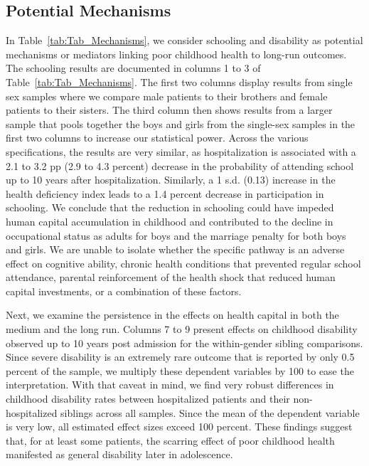 \documentclass[12pt,english]{article}
\begin{document}
\subsection[Potential mechanisms]{Potential Mechanisms}\label{subsec:Mechanisms}

In Table~\ref{tab:Tab_Mechanisms}, we consider schooling and disability as potential mechanisms or mediators linking poor childhood health to long-run outcomes. The schooling results are documented in columns 1 to 3 of Table~\ref{tab:Tab_Mechanisms}. The first two columns display results from single sex samples where we compare male patients to their brothers and female patients to their sisters. The third column then shows results from a larger sample that pools together the boys and girls from the single-sex samples in the first two columns to increase our statistical power. Across the various specifications, the results are very similar, as hospitalization is associated with a 2.1 to 3.2 pp (2.9 to 4.3 percent) decrease in the probability of attending school up to 10 years after hospitalization. Similarly, a 1 s.d. (0.13) increase in the health deficiency index leads to a 1.4 percent decrease in participation in schooling. We conclude that the reduction in schooling could have impeded human capital accumulation in childhood and contributed to the decline in occupational status as adults for boys and the marriage penalty for both boys and girls. We are unable to isolate whether the specific pathway is an adverse effect on cognitive ability, chronic health conditions that prevented regular school attendance, parental reinforcement of the health shock that reduced human capital investments, or a combination of these factors.

Next, we examine the persistence in the effects on health capital in both the medium and the long run. Columns 7 to 9 present effects on childhood disability observed up to 10 years post admission for the within-gender sibling comparisons. Since severe disability is an extremely rare outcome that is reported by only 0.5 percent of the sample, we multiply these dependent variables by 100 to ease the interpretation. With that caveat in mind, we find very robust differences in childhood disability rates between hospitalized patients and their non-hospitalized siblings across all samples. Since the mean of the dependent variable is very low, all estimated effect sizes exceed 100 percent. These findings suggest that, for at least some patients, the scarring effect of poor childhood health manifested as general disability later in adolescence. 
\end{document}
